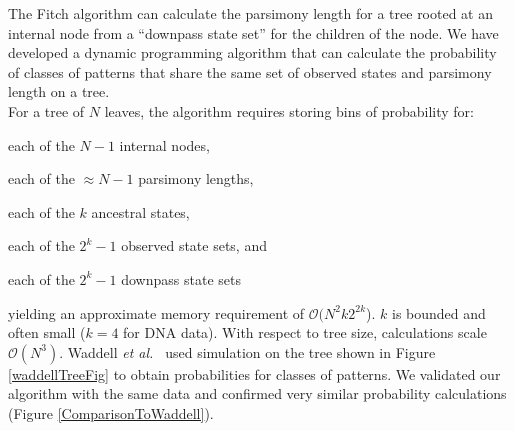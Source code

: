 \documentclass[a0paper,landscape]{baposter}
\begin{document}
\begin{poster}
{The Fitch algorithm can calculate the parsimony length for a tree rooted at an internal node from a ``downpass state set'' for the children of the node.
We have developed a dynamic programming algorithm that can calculate the probability of classes of patterns that share the same set of observed states and parsimony length on a tree.\\
For a tree of $N$ leaves, the algorithm requires storing bins of probability for:
\begin{compactitem}
	\item each of the $N-1$ internal nodes,
	\item each of the $\approx N - 1$ parsimony lengths,
	\item each of the $k$ ancestral states,
	\item  each of the $2^{k}-1$ observed state sets, and
	\item each of the $2^{k}-1$ downpass state sets
\end{compactitem}
yielding an approximate memory requirement of $\mathcal{O}(N^2 k 2^{2k}$).
$k$ is bounded and often small ($k=4$ for DNA data).
With respect to tree size, calculations scale $\mathcal{O}(N^3).$
Waddell {\em et al.~}\citep{WaddellOP2009} used simulation on the tree shown in Figure \ref{waddellTreeFig} to obtain probabilities for classes of patterns.
We validated our algorithm with the same data and confirmed very similar probability calculations (Figure \ref{ComparisonToWaddell}).


}
\end{poster}
\end{document}
